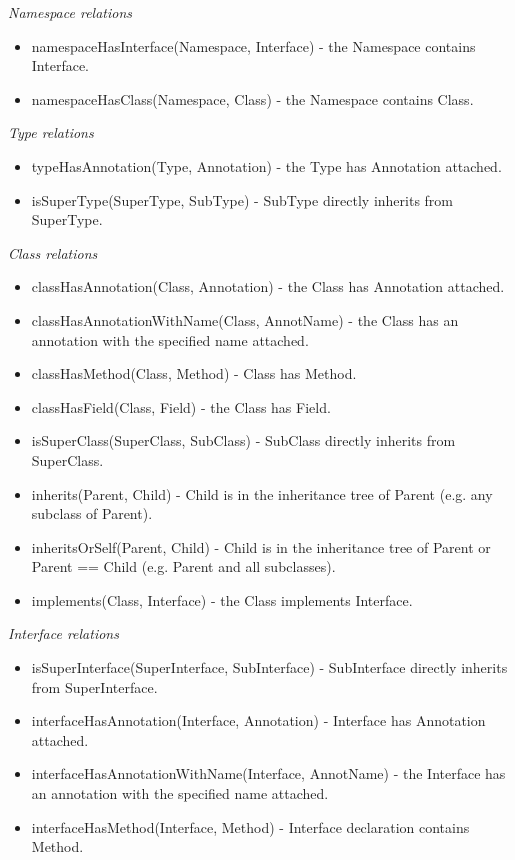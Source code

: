 \emph{Namespace relations}
\begin{itemize}
	\item namespaceHasInterface(Namespace, Interface) - the Namespace contains Interface.
  \item namespaceHasClass(Namespace, Class) - the Namespace contains Class.
\end{itemize}

\emph{Type relations}
\begin{itemize}
	\item typeHasAnnotation(Type, Annotation) - the Type has Annotation attached.
  \item isSuperType(SuperType, SubType) - SubType directly inherits from SuperType.
\end{itemize}

\emph{Class relations}
\begin{itemize}
	\item classHasAnnotation(Class, Annotation) - the Class has Annotation attached.
  \item classHasAnnotationWithName(Class, AnnotName) - the Class has an annotation with the specified name attached.
  \item classHasMethod(Class, Method) - Class has Method.
  \item classHasField(Class, Field) - the Class has Field.
  \item isSuperClass(SuperClass, SubClass) - SubClass directly inherits from SuperClass.
  \item inherits(Parent, Child) - Child is in the inheritance tree of Parent (e.g. any subclass of Parent).
  \item inheritsOrSelf(Parent, Child) - Child is in the inheritance tree of Parent or Parent == Child (e.g. Parent and all subclasses).
  \item implements(Class, Interface) - the Class implements Interface.
\end{itemize}

\emph{Interface relations}
\begin{itemize}
    \item isSuperInterface(SuperInterface, SubInterface) - SubInterface directly inherits from SuperInterface.
    \item interfaceHasAnnotation(Interface, Annotation) - Interface has Annotation attached.
    \item interfaceHasAnnotationWithName(Interface, AnnotName) - the Interface has an annotation with the specified name attached.
    \item interfaceHasMethod(Interface, Method) - Interface declaration contains Method.
\end{itemize}

